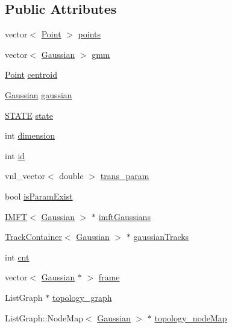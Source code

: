 \subsection*{\-Public \-Attributes}
\begin{DoxyCompactItemize}
\item 
vector$<$ \hyperlink{class_point}{\-Point} $>$ \hyperlink{class_p_c_object_a88519afe57e934c37b87cd74201573ae}{points}
\item 
vector$<$ \hyperlink{class_gaussian}{\-Gaussian} $>$ \hyperlink{class_p_c_object_a7eae3d72d8dfedee042050dc80df4423}{gmm}
\item 
\hyperlink{class_point}{\-Point} \hyperlink{class_p_c_object_a827d54b95fd8fbe64bd4f0fe7a7c1c80}{centroid}
\item 
\hyperlink{class_gaussian}{\-Gaussian} \hyperlink{class_p_c_object_a2a0a0fe603bac2c80a43d4f6e224bf98}{gaussian}
\item 
\hyperlink{pcobject_8h_a275a67132f10277ada3a0ee3d616b647}{\-S\-T\-A\-T\-E} \hyperlink{class_p_c_object_ad5a0566f1118a4e70d1de788c7dd4c06}{state}
\item 
int \hyperlink{class_p_c_object_aec75ff9931a685504afff6a7c1f78c02}{dimension}
\item 
int \hyperlink{class_p_c_object_a57cb1270dee62f9c65643f3cbe03347e}{id}
\item 
vnl\-\_\-vector$<$ double $>$ \hyperlink{class_p_c_object_aca5e8c66727c01980551ac8744bfb26a}{trans\-\_\-param}
\item 
bool \hyperlink{class_p_c_object_ab9a8f0b1f9d3b4851877e15e17582097}{is\-Param\-Exist}
\item 
\hyperlink{class_i_m_f_t}{\-I\-M\-F\-T}$<$ \hyperlink{class_gaussian}{\-Gaussian} $>$ $\ast$ \hyperlink{class_p_c_object_aa921fc68268138b7f5026ec1ccaef619}{imft\-Gaussians}
\item 
\hyperlink{class_track_container}{\-Track\-Container}$<$ \hyperlink{class_gaussian}{\-Gaussian} $>$ $\ast$ \hyperlink{class_p_c_object_a7d7a327eda5d75b554e2c83ba32a8517}{gaussian\-Tracks}
\item 
int \hyperlink{class_p_c_object_a1e854b1f05424e21b57571c4d5d3a639}{cnt}
\item 
vector$<$ \hyperlink{class_gaussian}{\-Gaussian} $\ast$ $>$ \hyperlink{class_p_c_object_acbc764cefd102f6b184192ffa266510f}{frame}
\item 
\-List\-Graph $\ast$ \hyperlink{class_p_c_object_a1e2497e50fb2af6cf043d91b3d2e14c6}{topology\-\_\-graph}
\item 
\-List\-Graph\-::\-Node\-Map$<$ \hyperlink{class_gaussian}{\-Gaussian} $>$ $\ast$ \hyperlink{class_p_c_object_a99eafcc86b98ec0f1d165b8a96d351dc}{topology\-\_\-node\-Map}

\end{DoxyCompactItemize}
